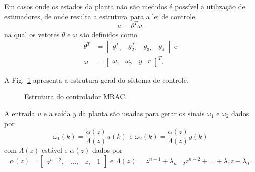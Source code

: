     Em casos onde os estados da planta não são medidos é possível a utilização de
    estimadores, de onde resulta a estrutura para a lei de
    controle~\cite{ref:TAO}
    \begin{equation}
        u = \theta^T \omega\text{,}
    \end{equation}
    na qual os vetores $\theta$ e $\omega$ são definidos como
    \begin{equation}
        \begin{split}
            \theta^T & = \left[ \begin{matrix} \theta_1^T, & \theta_2^T, & \theta_3, & \theta_4
                \end{matrix} \right]\text{ e}\\
            \omega & = {\left[ \begin{matrix} \omega_1 & \omega_2 & y & r \end{matrix}
                \right]}^T\text{.}
        \end{split}
    \end{equation}

    A Fig.~\ref{fig:cascata} apresenta a estrutura geral do sistema de controle.

    \begin{figure}[htb]
        \renewcommand\figurename{Fig.}
        \caption{Estrutura do controlador MRAC.}
        \label{fig:cascata}
    \end{figure}

    A entrada $u$ e a saída $y$ da planta são usadas para gerar os sinais $\omega_1$ e
    $\omega_2$ dados por
    \begin{equation}
            \omega_1(k) = \frac{\alpha(z)}{\Lambda(z)} u(k) \text{ e }
            \omega_2(k) = \frac{\alpha(z)}{\Lambda(z)} y(k)
        \label{eq:omega_1_2}
    \end{equation}
    com $\Lambda(z)$ estável e $\alpha(z)$ dados por
    \begin{equation*}
        \alpha(z) = \left[ \begin{matrix} z^{n-2}, & ..., & z, & 1 \end{matrix} \right]
        \text{ e }
        \Lambda(z) = z^{n-1} + \lambda_{n-2} z^{n-2} + ... + \lambda_1 z + \lambda_0\text{.}
    \end{equation*}

